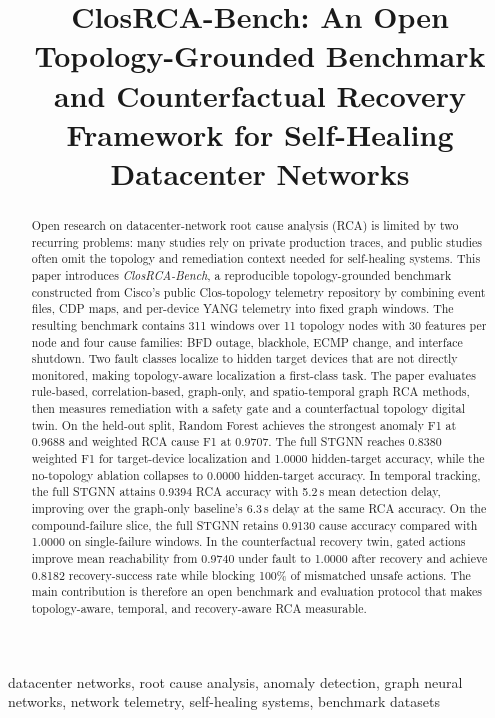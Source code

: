 \documentclass[conference]{IEEEtran}
\title{ClosRCA-Bench: An Open Topology-Grounded Benchmark and Counterfactual Recovery Framework for Self-Healing Datacenter Networks}
\author{
\IEEEauthorblockN{Dheeraj Ramasahayam}
\IEEEauthorblockA{
\textit{Independent Researcher} \\
United States
}
}
\begin{document}
\maketitle

\begin{abstract}
Open research on datacenter-network root cause analysis (RCA) is limited by two recurring problems: many studies rely on private production traces, and public studies often omit the topology and remediation context needed for self-healing systems. This paper introduces \textit{ClosRCA-Bench}, a reproducible topology-grounded benchmark constructed from Cisco's public Clos-topology telemetry repository by combining event files, CDP maps, and per-device YANG telemetry into fixed graph windows. The resulting benchmark contains 311 windows over 11 topology nodes with 30 features per node and four cause families: BFD outage, blackhole, ECMP change, and interface shutdown. Two fault classes localize to hidden target devices that are not directly monitored, making topology-aware localization a first-class task. The paper evaluates rule-based, correlation-based, graph-only, and spatio-temporal graph RCA methods, then measures remediation with a safety gate and a counterfactual topology digital twin. On the held-out split, Random Forest achieves the strongest anomaly F1 at 0.9688 and weighted RCA cause F1 at 0.9707. The full STGNN reaches 0.8380 weighted F1 for target-device localization and 1.0000 hidden-target accuracy, while the no-topology ablation collapses to 0.0000 hidden-target accuracy. In temporal tracking, the full STGNN attains 0.9394 RCA accuracy with 5.2\,s mean detection delay, improving over the graph-only baseline's 6.3\,s delay at the same RCA accuracy. On the compound-failure slice, the full STGNN retains 0.9130 cause accuracy compared with 1.0000 on single-failure windows. In the counterfactual recovery twin, gated actions improve mean reachability from 0.9740 under fault to 1.0000 after recovery and achieve 0.8182 recovery-success rate while blocking 100\% of mismatched unsafe actions. The main contribution is therefore an open benchmark and evaluation protocol that makes topology-aware, temporal, and recovery-aware RCA measurable.
\end{abstract}

\begin{IEEEkeywords}
datacenter networks, root cause analysis, anomaly detection, graph neural networks, network telemetry, self-healing systems, benchmark datasets
\end{IEEEkeywords}
\end{document}

